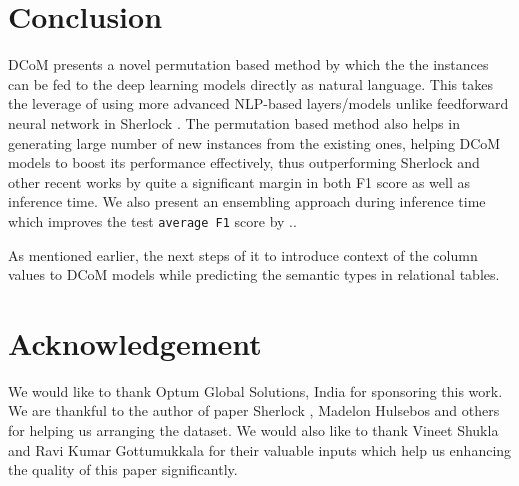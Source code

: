 \documentclass{article}
\begin{document}
\section{Conclusion}
\label{sec:conclusion}
DCoM presents a novel permutation based method by which the the instances can be fed to the deep learning models directly as natural language. This takes the leverage of using more advanced NLP-based layers/models unlike feedforward neural network in Sherlock \cite{Hulsebos}. The permutation based method also helps in generating large number of new instances from the existing ones, helping DCoM models to boost its performance effectively, thus outperforming Sherlock \cite{Hulsebos} and other recent works by quite a significant margin in both F1 score as well as inference time. We also present an ensembling approach during inference time which improves the test \texttt{average F1} score by ..  

As mentioned earlier, the next steps of it to introduce context of the column values to DCoM models while predicting the semantic types in relational tables.

\section*{Acknowledgement}
We would like to thank Optum Global Solutions, India for sponsoring this work. We are thankful to the author of paper Sherlock \cite{Hulsebos}, Madelon Hulsebos and others for helping us arranging the dataset. We would also like to thank
Vineet Shukla and Ravi Kumar Gottumukkala for their valuable inputs which help us enhancing the quality of this paper significantly.


\printbibliography
\end{document}
